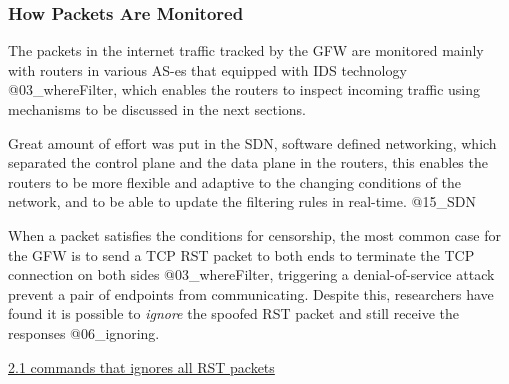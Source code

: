 \hypertarget{how-packets-are-monitored}{%
\subsubsection{How Packets Are
Monitored}\label{how-packets-are-monitored}}

The packets in the internet traffic tracked by the GFW are monitored
mainly with routers in various AS-es that equipped with IDS technology
@03\_whereFilter, which enables the routers to inspect incoming traffic
using mechanisms to be discussed in the next sections.

Great amount of effort was put in the SDN, software defined networking,
which separated the control plane and the data plane in the routers,
this enables the routers to be more flexible and adaptive to the
changing conditions of the network, and to be able to update the
filtering rules in real-time. @15\_SDN

When a packet satisfies the conditions for censorship, the most common
case for the GFW is to send a TCP RST packet to both ends to terminate
the TCP connection on both sides @03\_whereFilter, triggering a
denial-of-service attack prevent a pair of endpoints from communicating.
Despite this, researchers have found it is possible to \emph{ignore} the
spoofed RST packet and still receive the responses @06\_ignoring.

\begin{Shaded}
\begin{Highlighting}[]
 
\end{Highlighting}
\end{Shaded}

\href{}{2.1 commands that ignores all RST packets}

